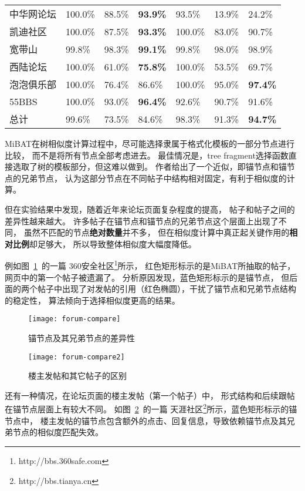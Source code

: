 \begin{table}[t]
\begin{tabular}{lllllll}
中华网论坛 & 100.0\% & 88.5\% & \textbf{93.9\%} & 93.5\% & 13.9\% & 24.2\% \\
凯迪社区 & 100.0\% & 87.5\% & \textbf{93.3\%} & 100.0\% & 83.0\% & 90.7\% \\
宽带山 & 99.8\% & 98.3\% & \textbf{99.1\%} & 99.8\% & 98.0\% & 98.9\% \\
西陆论坛 & 100.0\% & 61.0\% & \textbf{75.8\%} & 100.0\% & 53.5\% & 69.7\% \\
泡泡俱乐部 & 100.0\% & 76.4\% & 86.6\% & 100.0\% & 95.0\% & \textbf{97.4\%} \\ 
55BBS & 100.0\% & 93.0\% & \textbf{96.4\%} & 92.6\% & 90.7\% & 91.6\% \\
总计 & 99.6\% & 73.5\% & 84.6\% & 98.3\% & 91.3\% & \textbf{94.7\%} \\
\bottomrule[1.5pt]
\end{tabular}
\end{table}

MiBAT在树相似度计算过程中，尽可能选择隶属于格式化模板的一部分节点进行比较，
而不是将所有节点全部考虑进去。
最佳情况是，tree fragment选择函数直接选取了树的模板部分，但这难以做到。
作者给出了一个近似，即锚节点和锚节点的兄弟节点，
认为这部分节点在不同帖子中结构相对固定，有利于相似度的计算。

但在实验结果中发现，随着近年来论坛页面复杂程度的提高，
帖子和帖子之间的差异性越来越大。
许多帖子在锚节点和锚节点的兄弟节点这个层面上出现了不同，
虽然不匹配的节点\textbf{绝对数量}并不多，
但在相似度计算中真正起关键作用的\textbf{相对比例}却足够大，
所以导致整体相似度大幅度降低。

例如图~\ref{fig:forum-compare}~的一篇
360安全社区\footnote{http://bbs.360safe.com}所示，
红色矩形标示的是MiBAT所抽取的帖子，网页中的第一个帖子被遗漏了。
分析原因发现，蓝色矩形标示的是锚节点，
但后面的两个帖子中出现了对发帖的引用（红色椭圆），干扰了锚节点和兄弟节点结构的稳定性，
算法倾向于选择相似度更高的结果。

\begin{figure}[htbp]
\centering
\texttt{[image: forum-compare]}
\caption{锚节点及其兄弟节点的差异性}
\label{fig:forum-compare}
\end{figure}

\begin{figure}[htbp]
\centering
\texttt{[image: forum-compare2]}
\caption{楼主发帖和其它帖子的区别}
\label{fig:forum-compare2}
\end{figure}

还有一种情况，在论坛页面的楼主发帖（第一个帖子）中，
形式结构和后续跟帖在锚节点层面上有较大不同。
如图~\ref{fig:forum-compare2}~的一篇
天涯社区\footnote{http://bbs.tianya.cn}所示，蓝色矩形标示的锚节点中，
楼主发帖的锚节点包含额外的点击、回复信息，导致依赖锚节点及其兄弟节点的相似度匹配失效。

